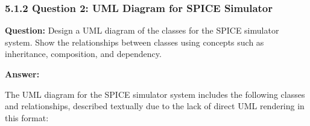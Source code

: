 \documentclass{article}
\begin{document}

\subsubsection*{5.1.2 Question 2: UML Diagram for SPICE Simulator}

\textbf{Question:} Design a UML diagram of the classes for the SPICE simulator system. Show the relationships between classes using concepts such as inheritance, composition, and dependency.

\textbf{Answer:}

The UML diagram for the SPICE simulator system includes the following classes and relationships, described textually due to the lack of direct UML rendering in this format:
\end{document}
